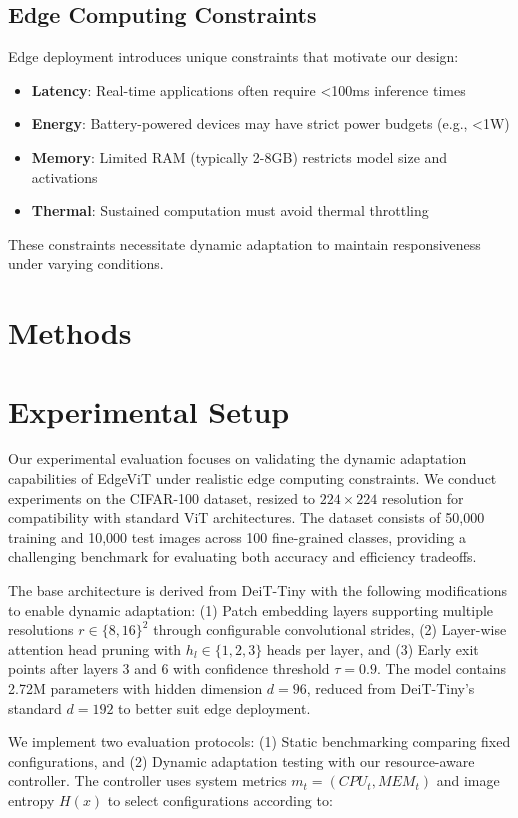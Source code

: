 \documentclass{article}
\begin{document}
\subsection{Edge Computing Constraints}
Edge deployment introduces unique constraints that motivate our design:
\begin{itemize}
    \item \textbf{Latency}: Real-time applications often require <100ms inference times
    \item \textbf{Energy}: Battery-powered devices may have strict power budgets (e.g., <1W)
    \item \textbf{Memory}: Limited RAM (typically 2-8GB) restricts model size and activations
    \item \textbf{Thermal}: Sustained computation must avoid thermal throttling
\end{itemize}

These constraints necessitate dynamic adaptation to maintain responsiveness under varying conditions.


\section{Methods}


\section{Experimental Setup}
Our experimental evaluation focuses on validating the dynamic adaptation capabilities of EdgeViT under realistic edge computing constraints. We conduct experiments on the CIFAR-100 dataset, resized to $224 \times 224$ resolution for compatibility with standard ViT architectures. The dataset consists of 50,000 training and 10,000 test images across 100 fine-grained classes, providing a challenging benchmark for evaluating both accuracy and efficiency tradeoffs.

The base architecture is derived from DeiT-Tiny with the following modifications to enable dynamic adaptation: (1) Patch embedding layers supporting multiple resolutions $r \in \{8,16\}^2$ through configurable convolutional strides, (2) Layer-wise attention head pruning with $h_l \in \{1,2,3\}$ heads per layer, and (3) Early exit points after layers 3 and 6 with confidence threshold $\tau = 0.9$. The model contains 2.72M parameters with hidden dimension $d=96$, reduced from DeiT-Tiny's standard $d=192$ to better suit edge deployment.

We implement two evaluation protocols: (1) Static benchmarking comparing fixed configurations, and (2) Dynamic adaptation testing with our resource-aware controller. The controller uses system metrics $m_t = (CPU_t, MEM_t)$ and image entropy $H(x)$ to select configurations according to:
\end{document}
